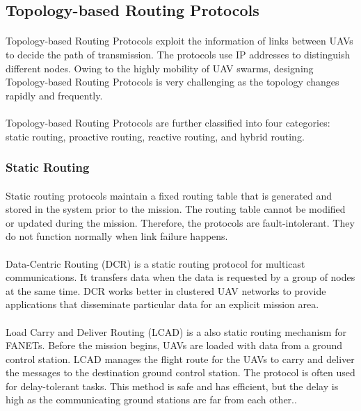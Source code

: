 \documentclass[a4paper,12pt]{report}
\begin{document}
\subsection{Topology-based Routing Protocols}
\paragraph{}
Topology-based Routing Protocols exploit the information of links between UAVs to decide the path of transmission. The protocols use IP addresses to distinguish different nodes. Owing to the highly mobility of UAV swarms, designing Topology-based Routing Protocols is very challenging as the topology changes rapidly and frequently.

\paragraph{}
Topology-based Routing Protocols are further classified into four categories: static routing, proactive routing, reactive routing, and hybrid routing\cite{8772093}.

\subsubsection{Static Routing}
\paragraph{}
Static routing protocols maintain a fixed routing table that is generated and stored in the system prior to the mission. The routing table cannot be modified or updated during the mission. Therefore, the protocols are fault-intolerant\cite{Yanmaz2018DroneNC}. They do not function normally when link failure happens.

\paragraph{}
Data-Centric Routing (DCR) is a static routing protocol for multicast communications. It transfers data when the data is requested by a group of nodes at the same time. DCR works better in clustered UAV networks to provide applications that disseminate particular data for an explicit mission area\cite{topobased}.

\paragraph{}
Load Carry and Deliver Routing (LCAD) is a also static routing mechanism for FANETs. Before the mission begins, UAVs are loaded with data from a ground control station. LCAD manages the flight route for the UAVs to carry and deliver the messages to the destination ground control station. The protocol is often used for delay-tolerant tasks. This method is safe and has efficient\cite{kung2008research, Yanmaz2018DroneNC, topobased}, but the delay is high as the communicating ground stations are far from each other.\cite{kung2008research, Yanmaz2018DroneNC, topobased}.
\end{document}
